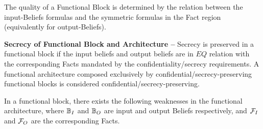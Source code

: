 The quality of a Functional Block is determined by the relation between the
input-Beliefs formulas and the symmetric formulas in the Fact region
(equivalently for output-Beliefs).

\begin{definition}{\bf Secrecy of Functional Block and Architecture --}\label{def:secfun}
	Secrecy is preserved in a functional block if the input beliefs and output beliefs
	are in $EQ$ relation with the corresponding Facts mandated by the confidentiality/secrecy requirements.
	A functional architecture composed exclusively by confidential/secrecy-preserving functional blocks
	is considered confidential/secrecy-preserving.
\end{definition}

In a functional block, there exists the following weaknesses in the functional
architecture, where $\mathbb{B}_I$ and $\mathbb{B}_O$ are input and
output Beliefs respectively, and $\mathcal{F}_I$ and $\mathcal{F}_O$ are
the corresponding Facts. 
